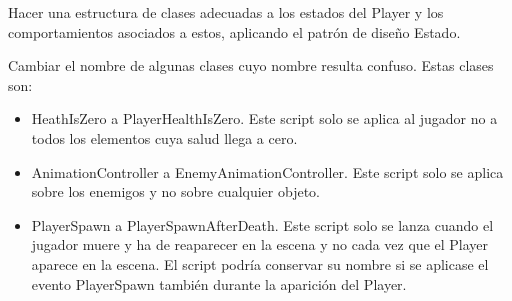 Hacer una estructura de clases adecuadas a los estados del Player y los comportamientos asociados a estos, aplicando el patrón de diseño Estado. 

Cambiar el nombre de algunas clases cuyo nombre resulta confuso. Estas clases son: 
\begin{itemize}
\item
HeathIsZero a PlayerHealthIsZero. Este script solo se aplica al jugador no a todos los elementos cuya salud llega a cero. 
\item
AnimationController a EnemyAnimationController. Este script solo se aplica sobre los enemigos y no sobre cualquier objeto. 
\item
PlayerSpawn a PlayerSpawnAfterDeath. Este script solo se lanza cuando el jugador muere y ha de reaparecer en la escena y no cada vez que el Player aparece en la escena. El script podría conservar su nombre si se aplicase el evento PlayerSpawn también durante la aparición del Player.
\end{itemize}


